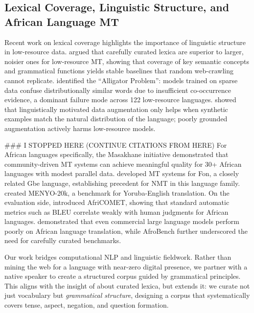 \documentclass[11pt]{article}
\begin{document}
\subsection{Lexical Coverage, Linguistic Structure, and African Language MT}

Recent work on lexical coverage highlights the importance of linguistic structure in low-resource data. \citet{jones-etal-2023-gatitos} argued that carefully curated lexica are superior to larger, noisier ones for low-resource MT, showing that coverage of key semantic concepts and grammatical functions yields stable baselines that random web-crawling cannot replicate. \citet{nielsen-etal-2025-alligators} identified the ``Alligator Problem'': models trained on sparse data confuse distributionally similar words due to insufficient co-occurrence evidence, a dominant failure mode across 122 low-resource languages. \citet{groshan-etal-2025-linguistically} showed that linguistically motivated data augmentation only helps when synthetic examples match the natural distribution of the language; poorly grounded augmentation actively harms low-resource models.

### I STOPPED HERE (CONTINUE CITATIONS FROM HERE)
For African languages specifically, the Masakhane initiative \citep{orife2020masakhane} demonstrated that community-driven MT systems can achieve meaningful quality for 30+ African languages with modest parallel data. \citet{dossou2021crowdsourced} developed MT systems for Fon, a closely related Gbe language, establishing precedent for NMT in this language family. \citet{adelani2022menyo20k} created MENYO-20k, a benchmark for Yoruba-English translation. On the evaluation side, \citet{wang2024afrimte} introduced AfriCOMET, showing that standard automatic metrics such as BLEU correlate weakly with human judgments for African languages. \citet{ojo2023commercial} demonstrated that even commercial large language models perform poorly on African language translation, while AfroBench \citep{ojo2025afrobench} further underscored the need for carefully curated benchmarks.

Our work bridges computational NLP and linguistic fieldwork. Rather than mining the web for a language with near-zero digital presence, we partner with a native speaker to create a structured corpus guided by grammatical principles. This aligns with the insight of \citet{jones2023gatitos} about curated lexica, but extends it: we curate not just vocabulary but \emph{grammatical structure}, designing a corpus that systematically covers tense, aspect, negation, and question formation.
\end{document}
